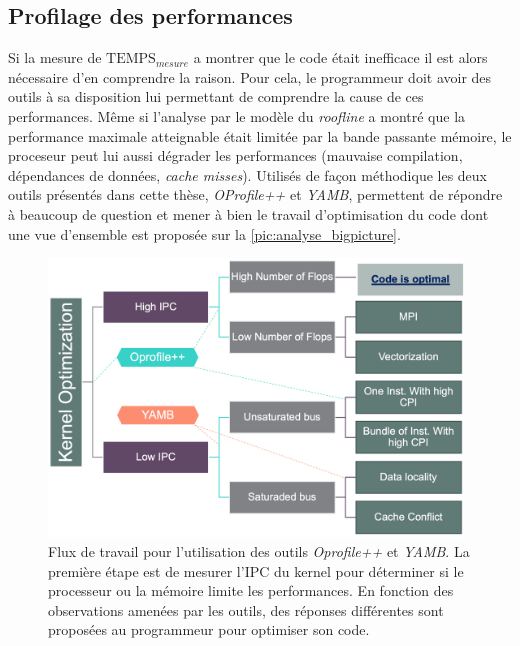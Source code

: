 \subsection{Profilage des performances}

Si la mesure de $\text{TEMPS}_{mesure}$  a montrer que le code était inefficace il est alors nécessaire d'en comprendre la raison. Pour cela, le programmeur doit avoir des outils à sa disposition lui permettant de comprendre la cause de ces performances. Même si l'analyse par le modèle du \textit{roofline} a montré que la performance maximale atteignable était limitée par la bande passante mémoire, le proceseur peut lui aussi dégrader les performances (mauvaise compilation, dépendances de données, \textit{cache misses}). Utilisés de façon méthodique les deux outils présentés dans cette thèse, \textit{OProfile++} et \textit{YAMB}, permettent de répondre à beaucoup de question et mener à bien le travail d'optimisation du code dont une vue d'ensemble est proposée sur la \autoref{pic:analyse_bigpicture}.

\begin{figure}
    \center
    \includegraphics[width=11cm]{images/analyse_bigpicture.png}
    \caption{\label{pic:analyse_bigpicture} Flux de travail pour l'utilisation des outils \textit{Oprofile++} et \textit{YAMB}. La première étape est de mesurer l'IPC du kernel pour déterminer si le processeur ou la mémoire limite les performances. En fonction des observations amenées par les outils, des réponses différentes sont proposées au programmeur pour optimiser son code.}
\end{figure}



